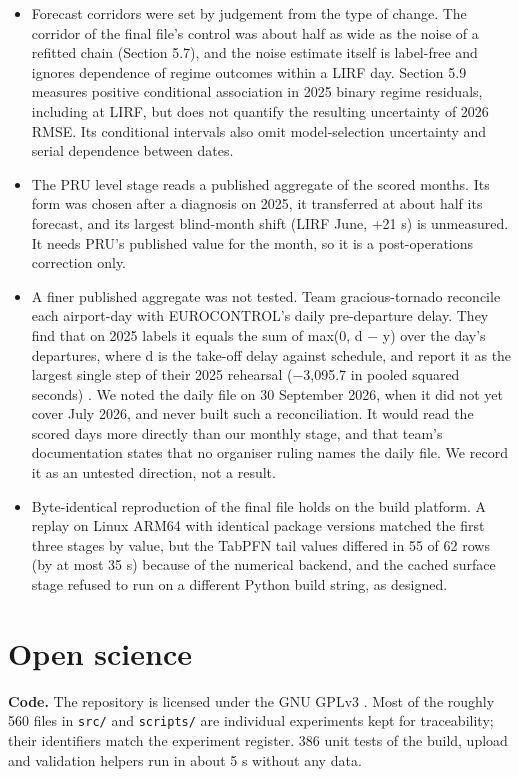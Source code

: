 \documentclass[
  manuscript=article,  %
  layout=preprint,     %
  year=2026,
  volume=4,
]{extra/joas}
\begin{document}
\begin{itemize}
\item
  Forecast corridors were set by judgement from the type of change. The corridor of the final file's control was about half as wide as the noise of a refitted chain (Section 5.7), and the noise estimate itself is label-free and ignores dependence of regime outcomes within a LIRF day. Section 5.9 measures positive conditional association in 2025 binary regime residuals, including at LIRF, but does not quantify the resulting uncertainty of 2026 RMSE. Its conditional intervals also omit model-selection uncertainty and serial dependence between dates.
\item
  The PRU level stage reads a published aggregate of the scored months. Its form was chosen after a diagnosis on 2025, it transferred at about half its forecast, and its largest blind-month shift (LIRF June, +21 s) is unmeasured. It needs PRU's published value for the month, so it is a post-operations correction only.
\item
  A finer published aggregate was not tested. Team gracious-tornado reconcile each airport-day with EUROCONTROL's daily pre-departure delay. They find that on 2025 labels it equals the sum of max(0, d $-$ y) over the day's departures, where d is the take-off delay against schedule, and report it as the largest single step of their 2025 rehearsal ($-$3,095.7 in pooled squared seconds) \autocite{gracioustornado2026}. We noted the daily file on 30 September 2026, when it did not yet cover July 2026, and never built such a reconciliation. It would read the scored days more directly than our monthly stage, and that team's documentation states that no organiser ruling names the daily file. We record it as an untested direction, not a result.
\item
  Byte-identical reproduction of the final file holds on the build platform. A replay on Linux ARM64 with identical package versions matched the first three stages by value, but the TabPFN tail values differed in 55 of 62 rows (by at most 35 s) because of the numerical backend, and the cached surface stage refused to run on a different Python build string, as designed.
\end{itemize}

\section{Open science}\label{open-science}

\textbf{Code.} The repository is licensed under the GNU GPLv3 \autocite{kolomiiets2026repo}. Most of the roughly 560 files in \texttt{src/\allowbreak{}} and \texttt{scripts/\allowbreak{}} are individual experiments kept for traceability; their identifiers match the experiment register. 386 unit tests of the build, upload and validation helpers run in about 5 s without any data.
\end{document}
